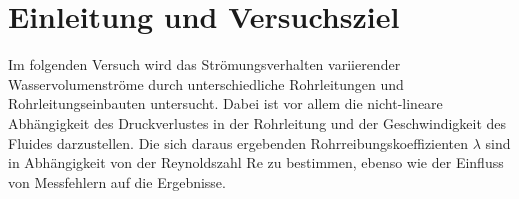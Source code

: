 \section{Einleitung und Versuchsziel}
\label{sec:aufgabenstellung}

Im folgenden Versuch wird das Strömungsverhalten variierender Wasservolumenströme durch unterschiedliche Rohrleitungen und Rohrleitungseinbauten untersucht. Dabei ist vor allem die nicht-lineare Abhängigkeit des Druckverlustes in der Rohrleitung und der Geschwindigkeit des Fluides darzustellen. Die sich daraus ergebenden Rohrreibungskoeffizienten $\lambda$ sind in Abhängigkeit von der Reynoldszahl Re zu bestimmen, ebenso wie der Einfluss von Messfehlern auf die Ergebnisse. 